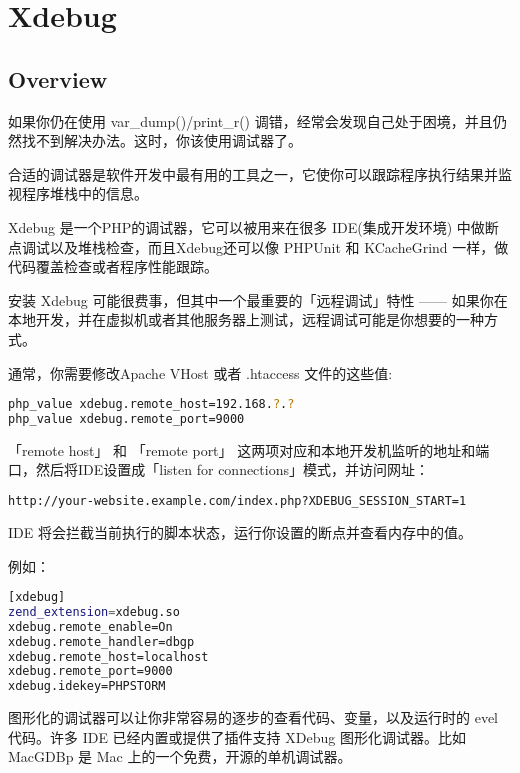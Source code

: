 \part{Xdebug}


\chapter{Overview}

如果你仍在使用 var\_dump()/print\_r() 调错，经常会发现自己处于困境，并且仍然找不到解决办法。这时，你该使用调试器了。

合适的调试器是软件开发中最有用的工具之一，它使你可以跟踪程序执行结果并监视程序堆栈中的信息。 

Xdebug 是一个PHP的调试器，它可以被用来在很多 IDE(集成开发环境) 中做断点调试以及堆栈检查，而且Xdebug还可以像 PHPUnit 和 KCacheGrind 一样，做代码覆盖检查或者程序性能跟踪。



安装 Xdebug 可能很费事，但其中一个最重要的「远程调试」特性 —— 如果你在本地开发，并在虚拟机或者其他服务器上测试，远程调试可能是你想要的一种方式。

通常，你需要修改Apache VHost 或者 .htaccess 文件的这些值:

\begin{lstlisting}[language=bash]
php_value xdebug.remote_host=192.168.?.?
php_value xdebug.remote_port=9000
\end{lstlisting}



「remote host」 和 「remote port」 这两项对应和本地开发机监听的地址和端口，然后将IDE设置成「listen for connections」模式，并访问网址：


\begin{lstlisting}[language=bash]
http://your-website.example.com/index.php?XDEBUG_SESSION_START=1
\end{lstlisting}



IDE 将会拦截当前执行的脚本状态，运行你设置的断点并查看内存中的值。

例如：

\begin{lstlisting}[language=bash]
[xdebug]
zend_extension=xdebug.so
xdebug.remote_enable=On
xdebug.remote_handler=dbgp
xdebug.remote_host=localhost
xdebug.remote_port=9000
xdebug.idekey=PHPSTORM
\end{lstlisting}


图形化的调试器可以让你非常容易的逐步的查看代码、变量，以及运行时的 evel 代码。许多 IDE 已经内置或提供了插件支持 XDebug 图形化调试器。比如 MacGDBp 是 Mac 上的一个免费，开源的单机调试器。